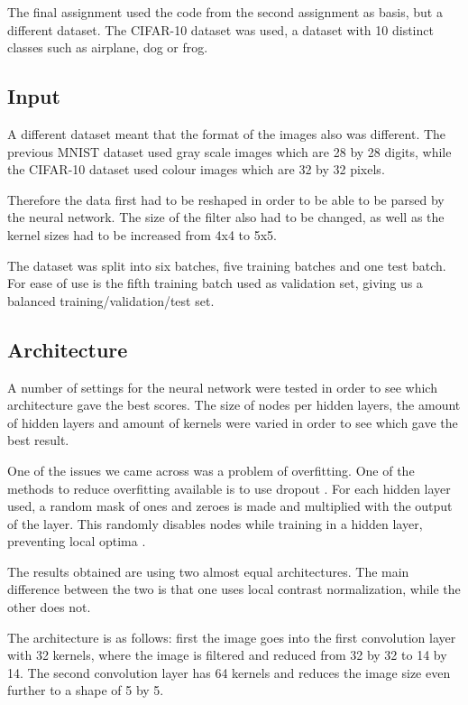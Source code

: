 
The final assignment used the code from the second assignment as basis, but a different dataset. The CIFAR-10 dataset was used, a dataset with 10 distinct classes such as airplane, dog or frog.

\subsection*{Input}
A different dataset meant that the format of the images also was different. The previous MNIST dataset used gray scale images which are 28 by 28 digits, while the CIFAR-10 dataset used colour images which are 32 by 32 pixels. 

Therefore the data first had to be reshaped in order to be able to be parsed by the neural network. The size of the filter also had to be changed, as well as the kernel sizes had to be increased from 4x4 to 5x5.

The dataset was split into six batches, five training batches and one test batch. For ease of use is the fifth training batch used as validation set, giving us a balanced training/validation/test set.

\subsection*{Architecture}
A number of settings for the neural network were tested in order to see which architecture gave the best scores. The size of nodes per hidden layers, the amount of hidden layers and amount of kernels were varied in order to see which gave the best result.

One of the issues we came across was a problem of overfitting. One of the methods to reduce overfitting available is to use dropout \cite{srivastava2014dropout}. For each hidden layer used, a random mask of ones and zeroes is made and multiplied with the output of the layer. This randomly disables nodes while training in a hidden layer, preventing local optima .

The results obtained are using two almost equal architectures. The main difference between the two is that one uses local contrast normalization, while the other does not.

The architecture is as follows: first the image goes into the first convolution layer with 32 kernels, where the image is filtered and reduced from 32 by 32 to 14 by 14. The second convolution layer has 64 kernels and reduces the image size even further to a shape of 5 by 5.  

